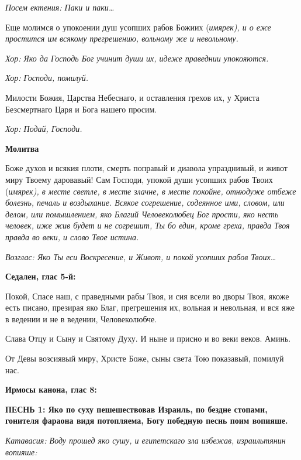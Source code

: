  \itshape  Посем ектения:\normalfont{} Паки и паки…


   Еще молимся о упокоении душ усопших рабов Божиих (\itshape  имярек\normalfont{}), и о еже
простится им всякому прегрешению, вольному же и невольному.


 \itshape  Хор:\normalfont{} Яко да Господь Бог учинит души их, идеже праведнии упокояются.


 \itshape  Хор:\normalfont{} Господи, помилуй.


   Милости Божия, Царства Небеснаго, и оставления грехов их, у Христа
Безсмертнаго Царя и Бога нашего просим.


 \itshape  Хор:\normalfont{} Подай, Господи.


 

\bfseries Молитва\normalfont{}

   Боже духов и всякия плоти, смерть поправый и диавола упразднивый, и
живот миру Твоему даровавый! Сам Господи, упокой души усопших рабов
Твоих (\itshape  имярек\normalfont{}), в месте светле, в месте злачне, в месте покойне,
отнюдуже отбеже болезнь, печаль и воздыхание. Всякое согрешение,
содеянное ими, словом, или делом, или помышлением, яко Благий
Человеколюбец Бог прости, яко несть человек, иже жив будет и не согрешит,
Ты бо един, кроме греха, правда Твоя правда во веки, и слово Твое
истина.


 \itshape  Возглас:\normalfont{} Яко Ты еси Воскресение, и Живот, и покой усопших рабов
Твоих…



 

\bfseries Седален, глас 5-й:\normalfont{}

   Покой, Спасе наш, с праведными рабы Твоя, и сия всели во дворы Твоя,
якоже есть писано, презирая яко Благ, прегрешения их, вольная и невольная,
и вся яже в ведении и не в ведении, Человеколюбче.


   Слава Отцу и Сыну и Святому Духу. И ныне и присно и во веки веков.
Аминь.


   От Девы возсиявый миру, Христе Боже, сыны света Тою показавый,
помилуй нас.


 

\bfseries Ирмосы канона, глас 8:\normalfont{}

 

\bfseries ПЕСНЬ 1:\normalfont{}  Яко по суху пешешествовав Израиль, по бездне стопами,
гонителя фараона видя потопляема, Богу победную песнь поим вопияше.


 \itshape Катавасия:\normalfont{} Воду прошед яко сушу, и египетскаго зла избежав,
израильтянин вопияше:


